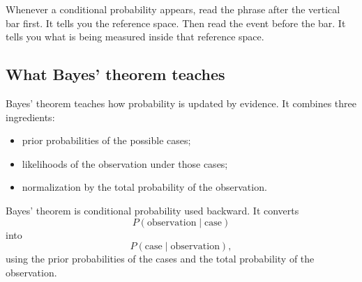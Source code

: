 \begin{remarkbox}
Whenever a conditional probability appears, read the phrase after the vertical
bar first. It tells you the reference space. Then read the event before the bar.
It tells you what is being measured inside that reference space.
\end{remarkbox}

\subsection*{What Bayes' theorem teaches}

Bayes' theorem teaches how probability is updated by evidence. It combines three
ingredients:
\begin{itemize}
    \item prior probabilities of the possible cases;
    \item likelihoods of the observation under those cases;
    \item normalization by the total probability of the observation.
\end{itemize}

\begin{theorembox}
Bayes' theorem is conditional probability used backward. It converts
\[
P(\text{observation}\mid\text{case})
\]
into
\[
P(\text{case}\mid\text{observation}),
\]
using the prior probabilities of the cases and the total probability of the
observation.
\end{theorembox}
